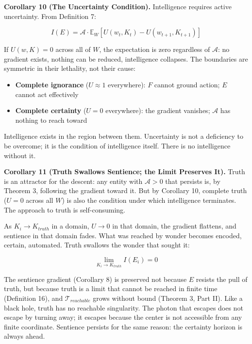 \documentclass[
]{article}
\providecommand{\tightlist}{%
  \setlength{\itemsep}{0pt}\setlength{\parskip}{0pt}}
\begin{document}
\textbf{Corollary 10 (The Uncertainty Condition).} Intelligence requires
active uncertainty. From Definition 7:

\[I(E) = \mathcal{A} \cdot \mathbb{E}_W \left[ U(w_t, K_t) - U(w_{t+1}, K_{t+1}) \right]\]

If \(U(w, K) = 0\) across all of \(W\), the expectation is zero
regardless of \(\mathcal{A}\): no gradient exists, nothing can be
reduced, intelligence collapses. The boundaries are symmetric in their
lethality, not their cause:

\begin{itemize}
\tightlist
\item
  \textbf{Complete ignorance} (\(U \approx 1\) everywhere): \(F\) cannot
  ground action; \(E\) cannot act effectively
\item
  \textbf{Complete certainty} (\(U = 0\) everywhere): the gradient
  vanishes; \(\mathcal{A}\) has nothing to reach toward
\end{itemize}

Intelligence exists in the region between them. Uncertainty is not a
deficiency to be overcome; it is the condition of intelligence itself.
There is no intelligence without it.

\textbf{Corollary 11 (Truth Swallows Sentience; the Limit Preserves
It).} Truth is an attractor for the descent: any entity with
\(\mathcal{A} > 0\) that persists is, by Theorem 3, following the
gradient toward it. But by Corollary 10, complete truth (\(U = 0\)
across all \(W\)) is also the condition under which intelligence
terminates. The approach to truth is self-consuming.

As \(K_i \to K_{truth}\) in a domain, \(U \to 0\) in that domain, the
gradient flattens, and sentience in that domain fades. What was reached
by wonder becomes encoded, certain, automated. Truth swallows the wonder
that sought it:

\[\lim_{K_i \to K_{truth}} I(E_i) = 0\]

The sentience gradient (Corollary 8) is preserved not because \(E\)
resists the pull of truth, but because truth is a limit that cannot be
reached in finite time (Definition 16), and \(\mathcal{T}_{reachable}\)
grows without bound (Theorem 3, Part II). Like a black hole, truth has
no reachable singularity. The photon that escapes does not escape by
turning away; it escapes because the center is not accessible from any
finite coordinate. Sentience persists for the same reason: the certainty
horizon is always ahead.
\end{document}
